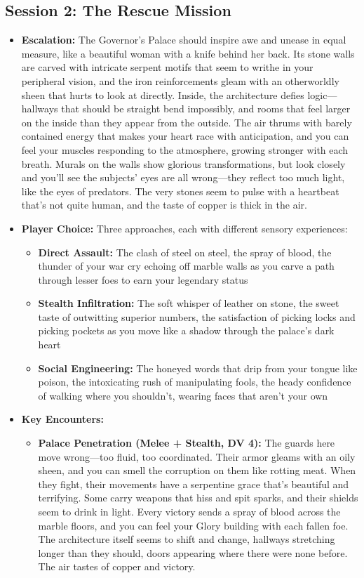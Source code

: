 \documentclass[11pt]{article}
\begin{document}
\subsection{Session 2: The Rescue Mission}
\begin{itemize}
\item \textbf{Escalation:} The Governor's Palace should inspire awe and unease in equal measure, like a beautiful woman with a knife behind her back. Its stone walls are carved with intricate serpent motifs that seem to writhe in your peripheral vision, and the iron reinforcements gleam with an otherworldly sheen that hurts to look at directly. Inside, the architecture defies logic—hallways that should be straight bend impossibly, and rooms that feel larger on the inside than they appear from the outside. The air thrums with barely contained energy that makes your heart race with anticipation, and you can feel your muscles responding to the atmosphere, growing stronger with each breath. Murals on the walls show glorious transformations, but look closely and you'll see the subjects' eyes are all wrong—they reflect too much light, like the eyes of predators. The very stones seem to pulse with a heartbeat that's not quite human, and the taste of copper is thick in the air.
\item \textbf{Player Choice:} Three approaches, each with different sensory experiences:
  \begin{itemize}
  \item \textbf{Direct Assault:} The clash of steel on steel, the spray of blood, the thunder of your war cry echoing off marble walls as you carve a path through lesser foes to earn your legendary status
  \item \textbf{Stealth Infiltration:} The soft whisper of leather on stone, the sweet taste of outwitting superior numbers, the satisfaction of picking locks and picking pockets as you move like a shadow through the palace's dark heart
  \item \textbf{Social Engineering:} The honeyed words that drip from your tongue like poison, the intoxicating rush of manipulating fools, the heady confidence of walking where you shouldn't, wearing faces that aren't your own
  \end{itemize}
\item \textbf{Key Encounters:}
  \begin{itemize}
  \item \textbf{Palace Penetration (Melee + Stealth, DV 4):} The guards here move wrong—too fluid, too coordinated. Their armor gleams with an oily sheen, and you can smell the corruption on them like rotting meat. When they fight, their movements have a serpentine grace that's beautiful and terrifying. Some carry weapons that hiss and spit sparks, and their shields seem to drink in light. Every victory sends a spray of blood across the marble floors, and you can feel your Glory building with each fallen foe. The architecture itself seems to shift and change, hallways stretching longer than they should, doors appearing where there were none before. The air tastes of copper and victory.

\end{itemize}
\end{itemize}
\end{document}
